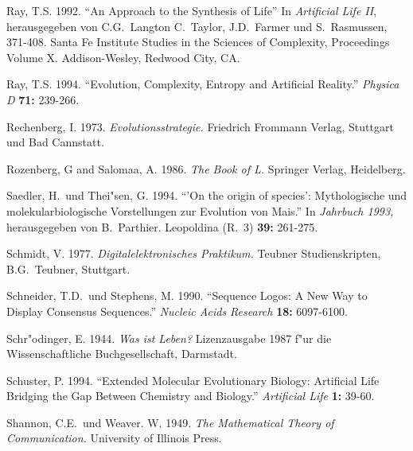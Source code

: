 \begin{thebibliography}{99}
Ray, T.S. 1992. "`An Approach to the Synthesis of Life"'
In \textsl{Artificial Life II}, herausgegeben von C.G.\ Langton 
C.\ Taylor, J.D.\ Farmer und S.\ Rasmussen, 371-408. Santa Fe
Institute Studies in the Sciences of Complexity, Proceedings Volume X.
Addison-Wesley, Redwood City, CA.

Ray, T.S. 1994. "`Evolution, Complexity, Entropy and Artificial Reality."'
\textsl{Physica D} \textbf{71:} 239-266.

Rechenberg, I. 1973. \textsl{Evolutionsstrategie.} Friedrich Frommann Verlag, Stuttgart
und Bad Cannstatt.

Rozenberg, G and Salomaa, A. 1986. \textsl{The Book of L.} Springer Verlag, Heidelberg.

Saedler, H.\ und Thei"sen, G. 1994. "`'On the origin of species': Mythologische und molekularbiologische
Vorstellungen zur Evolution von Mais."' In \textsl{Jahrbuch 1993,} herausgegeben von B.\ Parthier.
Leopoldina (R.\ 3) \textbf{39:} 261-275.

Schmidt, V. 1977. \textsl{Digitalelektronisches Praktikum.} Teubner Studienskripten, B.G.\ Teubner, Stuttgart.


Schneider, T.D.\ und Stephens, M. 1990. "`Sequence Logos: A New Way to Display Consensus Sequences."'
\textsl{Nucleic Acids Research} \textbf{18:} 6097-6100.

Schr"odinger, E. 1944. \textsl{Was ist Leben?} Lizenzausgabe 1987 f"ur die Wissenschaftliche
Buchgesellschaft, Darmstadt.

Schuster, P. 1994. "`Extended Molecular Evolutionary Biology: Artificial Life
Bridging the Gap Between Chemistry and Biology."' \textsl{Artificial Life}
\textbf{1:} 39-60.


Shannon, C.E.\ und Weaver. W. 1949. \textsl{The Mathematical Theory of
Communication.} University of Illinois Press.


\end{thebibliography}
